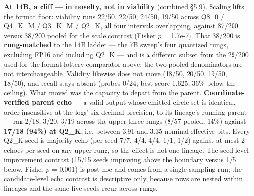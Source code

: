 \documentclass[11pt]{article}
\begin{document}
\textbf{At 14B, a cliff --- in novelty, not in viability} (combined \S5.9). Scaling lifts the
format floor: viability runs 22/50, 22/50, 24/50, 19/50 across Q8\_0 / Q4\_K\_M / Q3\_K\_M /
Q2\_K, all four intervals overlapping, against 87/200 versus 38/200 pooled for the
scale contrast (Fisher $p$ = 1.7e-7). That 38/200 is \textbf{rung-matched} to the 14B ladder ---
the 7B sweep's four quantized rungs, excluding FP16 and including Q2\_K --- and is a
different subset from the 29/200 used for the format-lottery comparator above; the two
pooled denominators are not interchangeable. Validity likewise does not move (18/50,
20/50, 19/50, 18/50), and recall stays absent (probes 0/24; best score 1.625, 36\% below
the ceiling). What moved was the capacity to depart from the parent. \textbf{Coordinate-verified
parent echo} --- a valid output whose emitted circle set is identical, order-insensitive at
the logs' six-decimal precision, to its lineage's running parent --- ran 2/18, 3/20, 3/19
across the upper three rungs (8/57 pooled, 14\%) against \textbf{17/18 (94\%) at Q2\_K}, i.e.
between 3.91 and 3.35 nominal effective bits. Every Q2\_K seed is majority-echo (per-seed
7/7, 4/4, 4/4, 1/1, 1/2) against at most 2 echoes per seed on any upper rung, so the
effect is not one lineage. The seed-level improvement contrast (15/15 seeds improving
above the boundary versus 1/5 below, Fisher $p$ = 0.001) is post-hoc and comes from a
single sampling run; the candidate-level echo contrast is descriptive only, because rows
are nested within lineages and the same five seeds recur across rungs.
\end{document}
